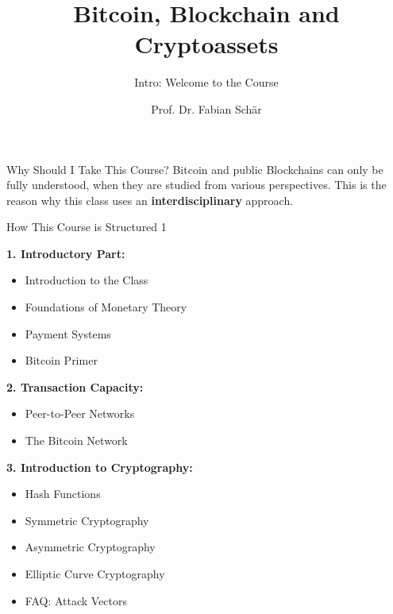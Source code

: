 \documentclass[handout]{beamer}
\title{Bitcoin, Blockchain and Cryptoassets}
\subtitle{Intro: Welcome to the Course}
\author{Prof. Dr. Fabian Schär}
\institute{University of Basel}
\begin{document}
\thispagestyle{empty}
\begin{frame}[noframenumbering]
	\titlepage
\end{frame}

\begin{frame}{Why Should I Take This Course?}
	\uncover<1->{
		\begin{figure}[h]
  			\center
			
		\end{figure}
	}
	\vspace{1em}
Bitcoin and public Blockchains can only be fully understood, when they are studied from various perspectives. This is the reason why this class uses an \color{focus} \textbf{interdisciplinary} \color{black} approach.	
\end{frame}

\begin{frame}{How This Course is Structured 1}
\footnotesize

\textbf{1. Introductory Part:}
	\begin{itemize}
		\item Introduction to the Class
		\item Foundations of Monetary Theory
		\item Payment Systems
		\item Bitcoin Primer
	\end{itemize}
	
\vspace{0.5em}

\textbf{2. Transaction Capacity:}
	\begin{itemize}
		\item Peer-to-Peer Networks
		\item The Bitcoin Network
	\end{itemize}

\vspace{0.5em}	
	
\textbf{3. Introduction to Cryptography:}
	\begin{itemize}
		\item Hash Functions
		\item Symmetric Cryptography
		\item Asymmetric Cryptography
		\item Elliptic Curve Cryptography
		\item FAQ: Attack Vectors
	\end{itemize}
	
\end{frame}
\end{document}
